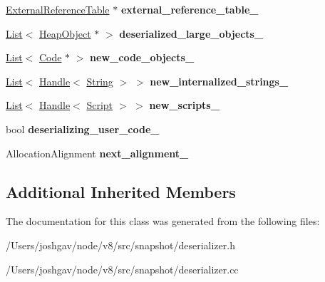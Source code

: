 \begin{DoxyCompactItemize}
\item 
\hyperlink{classv8_1_1internal_1_1_external_reference_table}{External\+Reference\+Table} $\ast$ {\bfseries external\+\_\+reference\+\_\+table\+\_\+}\hypertarget{classv8_1_1internal_1_1_deserializer_a7b0356ca139b5b26b0a436f4a0f12ed1}{}\label{classv8_1_1internal_1_1_deserializer_a7b0356ca139b5b26b0a436f4a0f12ed1}

\item 
\hyperlink{classv8_1_1internal_1_1_list}{List}$<$ \hyperlink{classv8_1_1internal_1_1_heap_object}{Heap\+Object} $\ast$ $>$ {\bfseries deserialized\+\_\+large\+\_\+objects\+\_\+}\hypertarget{classv8_1_1internal_1_1_deserializer_a69fb23dae191b385501079be0894873b}{}\label{classv8_1_1internal_1_1_deserializer_a69fb23dae191b385501079be0894873b}

\item 
\hyperlink{classv8_1_1internal_1_1_list}{List}$<$ \hyperlink{classv8_1_1internal_1_1_code}{Code} $\ast$ $>$ {\bfseries new\+\_\+code\+\_\+objects\+\_\+}\hypertarget{classv8_1_1internal_1_1_deserializer_aa0937f305d15ba723ffaea14eff59b58}{}\label{classv8_1_1internal_1_1_deserializer_aa0937f305d15ba723ffaea14eff59b58}

\item 
\hyperlink{classv8_1_1internal_1_1_list}{List}$<$ \hyperlink{classv8_1_1internal_1_1_handle}{Handle}$<$ \hyperlink{classv8_1_1internal_1_1_string}{String} $>$ $>$ {\bfseries new\+\_\+internalized\+\_\+strings\+\_\+}\hypertarget{classv8_1_1internal_1_1_deserializer_aeae466d8a728bd3cbe40918decea1fec}{}\label{classv8_1_1internal_1_1_deserializer_aeae466d8a728bd3cbe40918decea1fec}

\item 
\hyperlink{classv8_1_1internal_1_1_list}{List}$<$ \hyperlink{classv8_1_1internal_1_1_handle}{Handle}$<$ \hyperlink{classv8_1_1internal_1_1_script}{Script} $>$ $>$ {\bfseries new\+\_\+scripts\+\_\+}\hypertarget{classv8_1_1internal_1_1_deserializer_ad0bfa52706625efed47add87332c672f}{}\label{classv8_1_1internal_1_1_deserializer_ad0bfa52706625efed47add87332c672f}

\item 
bool {\bfseries deserializing\+\_\+user\+\_\+code\+\_\+}\hypertarget{classv8_1_1internal_1_1_deserializer_ad76c855151aaa54b2d7b795386e8a63e}{}\label{classv8_1_1internal_1_1_deserializer_ad76c855151aaa54b2d7b795386e8a63e}

\item 
Allocation\+Alignment {\bfseries next\+\_\+alignment\+\_\+}\hypertarget{classv8_1_1internal_1_1_deserializer_a9dbd85144685566d2c1c1b555c75eb1d}{}\label{classv8_1_1internal_1_1_deserializer_a9dbd85144685566d2c1c1b555c75eb1d}

\end{DoxyCompactItemize}
\subsection*{Additional Inherited Members}


The documentation for this class was generated from the following files\+:\begin{DoxyCompactItemize}
\item 
/\+Users/joshgav/node/v8/src/snapshot/deserializer.\+h\item 
/\+Users/joshgav/node/v8/src/snapshot/deserializer.\+cc\end{DoxyCompactItemize}
